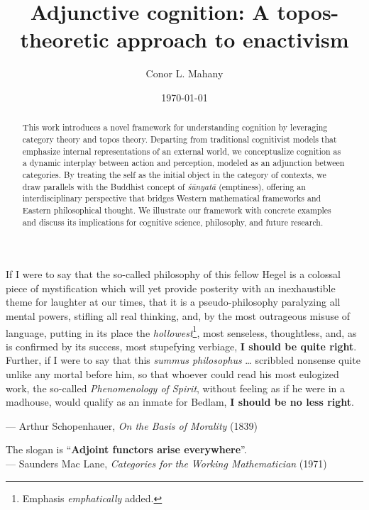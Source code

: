 \documentclass{article}
\title{Adjunctive cognition: A topos-theoretic approach to enactivism}
\author{Conor L. Mahany}
\date{\today}
\begin{document}
\maketitle

\begin{abstract}
    This work introduces a novel framework for understanding cognition by leveraging category theory and topos theory. Departing from traditional cognitivist models that emphasize internal representations of an external world, we conceptualize cognition as a dynamic interplay between action and perception, modeled as an adjunction between categories. By treating the self as the initial object in the category of contexts, we draw parallels with the Buddhist concept of \emph{śūnyatā} (emptiness), offering an interdisciplinary perspective that bridges Western mathematical frameworks and Eastern philosophical thought. We illustrate our framework with concrete examples and discuss its implications for cognitive science, philosophy, and future research.
\end{abstract}

\newpage
\begin{center}
    If I were to say that the so-called philosophy of this fellow Hegel is a colossal piece of mystification which will yet provide posterity with an inexhaustible theme for laughter at our times, that it is a pseudo-philosophy paralyzing all mental powers, stifling all real thinking, and, by the most outrageous misuse of language, putting in its place the \emph{hollowest}\footnote{Emphasis \emph{emphatically} added.}, most senseless, thoughtless, and, as is confirmed by its success, most stupefying verbiage, \textbf{I should be quite right}.\\
    \vspace{0.25cm}
    Further, if I were to say that this \emph{summus philosophus} … scribbled nonsense quite unlike any mortal before him, so that whoever could read his most eulogized work, the so-called \emph{Phenomenology of Spirit}, without feeling as if he were in a madhouse, would qualify as an inmate for Bedlam, \textbf{I should be no less right}.

    \vspace{0.25cm}
    — Arthur Schopenhauer, \emph{On the Basis of Morality} (1839)
\end{center}

\vspace{20px} %

\begin{center}
    The slogan is ``\textbf{Adjoint functors arise everywhere}''. \\

    \vspace{0.25cm}
    — Saunders Mac Lane, \emph{Categories for the Working Mathematician} (1971)
\end{center}
\end{document}
